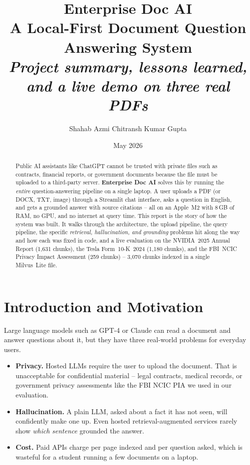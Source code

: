 \documentclass[11pt,a4paper]{article}
\title{
  \vspace{-1.0cm}
  \textbf{Enterprise Doc AI}\\
  \vspace{2pt}
  \large A Local-First Document Question Answering System\\
  \normalsize\emph{Project summary, lessons learned, and a live demo on three real PDFs}
}
\author{Shahab Azmi \quad\textperiodcentered\quad Chitransh Kumar Gupta}
\date{May 2026}
\begin{document}
\maketitle
\vspace{-0.7cm}

\begin{abstract}
\noindent
Public AI assistants like ChatGPT cannot be trusted with private files such as
contracts, financial reports, or government documents because the file must
be uploaded to a third-party server. \textbf{Enterprise Doc AI} solves this by
running the \emph{entire} question-answering pipeline on a single laptop. A
user uploads a PDF (or DOCX, TXT, image) through a Streamlit chat interface,
asks a question in English, and gets a grounded answer with source citations
-- all on an Apple~M2 with 8\,GB of RAM, no GPU, and no internet at query
time. This report is the story of how the system was built. It walks through
the architecture, the upload pipeline, the query pipeline, the specific
\emph{retrieval, hallucination, and grounding} problems hit along the way and
how each was fixed in code, and a live evaluation on the NVIDIA~2025 Annual
Report (1{,}631 chunks), the Tesla Form~10-K~2024 (1{,}180 chunks), and the
FBI~NCIC Privacy Impact Assessment (259 chunks) -- 3{,}070 chunks indexed in
a single Milvus~Lite file.
\end{abstract}

\section{Introduction and Motivation}
\label{sec:intro}

Large language models such as GPT-4 or Claude can read a document and answer
questions about it, but they have three real-world problems for everyday
users.

\begin{itemize}[leftmargin=18pt,topsep=2pt,itemsep=2pt]
  \item \textbf{Privacy.} Hosted LLMs require the user to upload the
        document. That is unacceptable for confidential material -- legal
        contracts, medical records, or government privacy assessments like
        the FBI NCIC PIA we used in our evaluation.
  \item \textbf{Hallucination.} A plain LLM, asked about a fact it has not
        seen, will confidently make one up. Even hosted retrieval-augmented
        services rarely show \emph{which sentence} grounded the answer.
  \item \textbf{Cost.} Paid APIs charge per page indexed and per question
        asked, which is wasteful for a student running a few documents on a
        laptop.
\end{itemize}
\end{document}
